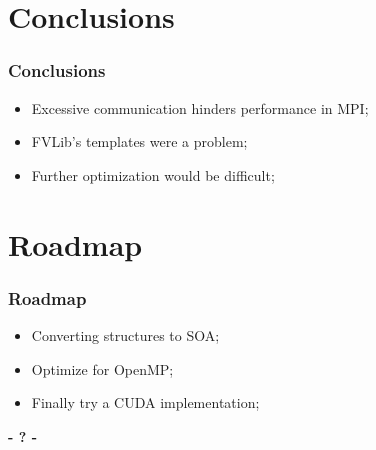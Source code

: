 \documentclass{beamer}
\begin{document}
\section{Conclusions}

\begin{frame}
	\frametitle{Conclusions}
	\begin{itemize}
		\item Excessive communication hinders performance in MPI;
		\item FVLib's templates were a problem;
		\item Further optimization would be difficult;
	\end{itemize}	
\end{frame}

\section{Roadmap}

\begin{frame}
\frametitle{Roadmap}
	\begin{center}	
	\begin{itemize}		
		\item Converting structures to SOA;
		\item Optimize for OpenMP;
		\item Finally try a CUDA implementation;
	\end{itemize}
	\end{center}
\end{frame}

\begin{frame}
\titlepage
	\begin{center}
		\Huge\bfseries
		- ? -
	\end{center}
\end{frame}
\end{document}
